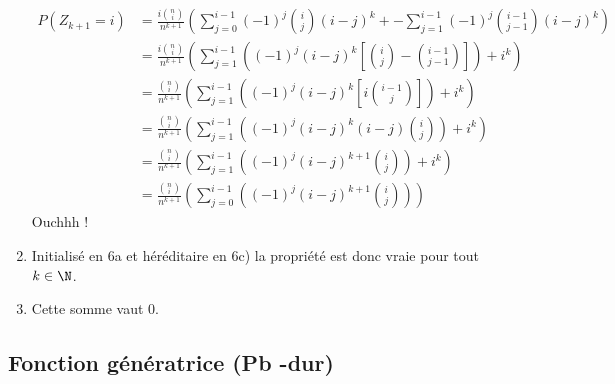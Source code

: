 \begin{correction}
\begin{enumerate}
\begin{align*}
P(Z_{k+1} = i) &=   \frac{i\binom{n}{i}}{n^{k+1}} \left(\sum_{j=0}^{i-1} (-1)^j \binom{i}{j}(i-j)^k  +
- \sum_{j=1}^{i-1} (-1)^j \binom{i-1}{j-1}(i-j)^k
\right) \\
&= \frac{i\binom{n}{i}}{n^{k+1}} \left( 
 \sum_{j=1}^{i-1} \left( (-1)^j (i-j)^k\left[ \binom{i}{j} - \binom{i-1}{j-1} \right]\right) +i^k
\right) \\
&= \frac{\binom{n}{i}}{n^{k+1}} \left( 
 \sum_{j=1}^{i-1} \left((-1)^j (i-j)^k\left[i \binom{i-1}{j}\right] \right)+i^k
\right) \\
&= \frac{\binom{n}{i}}{n^{k+1}} \left( 
 \sum_{j=1}^{i-1} \left((-1)^j (i-j)^k (i-j) \binom{i}{j} \right)+i^k
\right) \\
&= \frac{\binom{n}{i}}{n^{k+1}} \left( 
 \sum_{j=1}^{i-1} \left((-1)^j (i-j)^{k+1}  \binom{i}{j} \right)+i^k
\right) \\
&= \frac{\binom{n}{i}}{n^{k+1}} \left( 
 \sum_{j=0}^{i-1} \left((-1)^j (i-j)^{k+1}  \binom{i}{j} \right)
\right) 
\end{align*}
Ouchhh !
 



\item Initialisé en 6a et héréditaire en 6c) la propriété est donc vraie pour tout $k\in \N$. 
\item Cette somme vaut 0. 
\end{enumerate}
\end{correction}



\subsection{Fonction génératrice (Pb -dur)}

